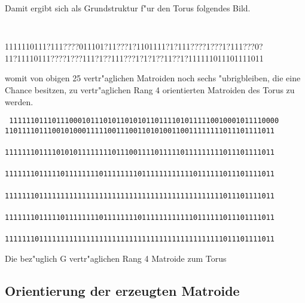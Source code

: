 Damit ergibt sich als Grundstruktur f"ur den Torus folgendes Bild.

{\small\tt
\begin{center}
1111110111?111????011101?11???1?1101111?1?111????1???1?111???0?\\
11?11110111????1???111?1??111???1?1?1??11??1?111111011101111011\\
\end{center}
}

womit von obigen 25 vertr"aglichen Matroiden noch sechs "ubrigbleiben, die eine
Chance besitzen, zu vertr"aglichen Rang 4 orientierten Matroiden des Torus
zu werden.

\begin{table}[htb]
\begin{center}
{\scriptsize\tt
{}
111111011101110001011101011010101101111010111110010001011110000\\
110111101110010100011111001110011010100110011111111011101111011\\
\\
111111101111010101111111101110011110111110111111111011101111011\\
\\
111111101111101111111101111111101111111111110111111011101111011\\
\\
111111101111111111111111111111111111111111111111111011101111011\\
\\
111111101111101111111101111111101111111111110111111011101111011\\
\\
111111101111111111111111111111111111111111111111111011101111011\\
\etab
}
\end{center}
\caption{Die bez"uglich G vertr"aglichen Rang 4 Matroide zum Torus}
\label{torus4mat}
\end{table}

\clearpage
\subsection{Orientierung der erzeugten Matroide}

